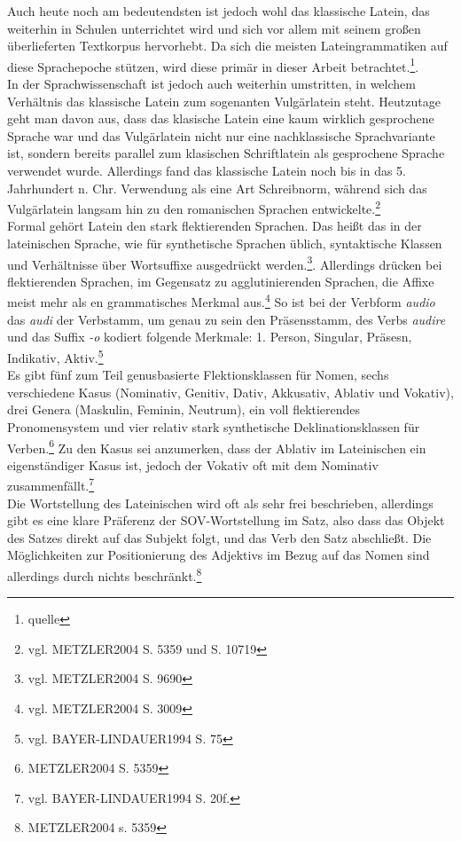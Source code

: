 \documentclass[11pt]{scrartcl}
\begin{document}
Auch heute noch am bedeutendsten ist jedoch wohl das klassische Latein, das weiterhin in Schulen unterrichtet wird und sich vor allem mit seinem großen überlieferten Textkorpus hervorhebt. Da sich die meisten Lateingrammatiken auf diese Sprachepoche stützen, wird diese primär in dieser Arbeit betrachtet.\footnote{quelle}. \\
In der Sprachwissenschaft ist jedoch auch weiterhin umstritten, in welchem Verhältnis das klassische Latein zum sogenanten Vulgärlatein steht. Heutzutage geht man davon aus, dass das klasische Latein eine kaum wirklich gesprochene Sprache war und das Vulgärlatein nicht nur eine nachklassische Sprachvariante ist, sondern bereits parallel zum klasischen Schriftlatein als gesprochene Sprache verwendet wurde. Allerdings fand das klassische Latein noch bis in das 5. Jahrhundert n. Chr. Verwendung als eine Art Schreibnorm, während sich das Vulgärlatein langsam hin zu den romanischen Sprachen entwickelte.\footnote{vgl. METZLER2004 S. 5359 und S. 10719} \\
Formal gehört Latein den stark flektierenden Sprachen. Das heißt das in der lateinischen Sprache, wie für synthetische Sprachen üblich, syntaktische Klassen und Verhältnisse über Wortsuffixe ausgedrückt werden.\footnote{vgl. METZLER2004 S. 9690}. Allerdings drücken bei flektierenden Sprachen, im Gegensatz zu agglutinierenden Sprachen, die Affixe meist mehr als en grammatisches Merkmal aus.\footnote{vgl. METZLER2004 S. 3009} So ist bei der Verbform \textit{audio} das \textit{audi} der Verbstamm, um genau zu sein den Präsensstamm, des Verbs \textit{audire} und das Suffix \textit{-o} kodiert folgende Merkmale: 1. Person, Singular, Präsesn, Indikativ, Aktiv.\footnote{vgl. BAYER-LINDAUER1994 S. 75} \\
 Es gibt fünf zum Teil genusbasierte Flektionsklassen für Nomen, sechs verschiedene Kasus (Nominativ, Genitiv, Dativ, Akkusativ, Ablativ und Vokativ), drei Genera (Maskulin, Feminin, Neutrum), ein voll flektierendes Pronomensystem und vier relativ stark synthetische Deklinationsklassen für Verben.\footnote{METZLER2004 S. 5359} Zu den Kasus sei anzumerken, dass der Ablativ im Lateinischen ein eigenständiger Kasus ist, jedoch der Vokativ oft mit dem Nominativ zusammenfällt.\footnote{vgl. BAYER-LINDAUER1994 S. 20f.} \\
Die Wortstellung des Lateinischen wird oft als sehr frei beschrieben, allerdings gibt es eine klare Präferenz der SOV-Wortstellung im Satz, also dass das Objekt des Satzes direkt auf das Subjekt folgt, und das Verb den Satz abschließt. Die Möglichkeiten zur Positionierung des Adjektivs im Bezug auf das Nomen sind allerdings durch nichts beschränkt.\footnote{METZLER2004 s. 5359}
\end{document}
